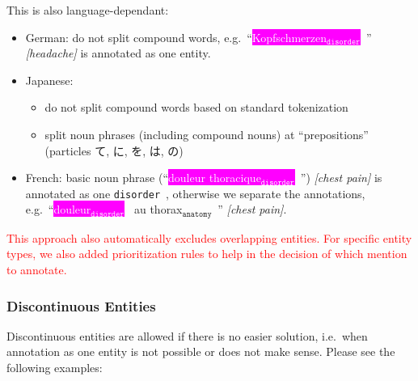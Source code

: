 \documentclass[12pt]{article}
\theoremstyle{definition}
\newcommand{\anatomy}[1]{\colorbox{dollarbill}{#1$_{\texttt{anatomy}}$}\ }
\newcommand{\disorder}[1]{\colorbox{fuchsia}{\textcolor{white}{#1$_{\texttt{disorder}}$}}\ }
\newcommand{\dis}{\texttt{disorder}\ }
\begin{document}
This is also language-dependant:
\begin{itemize}
    \item German: do not split compound words, e.g.~``\disorder{Kopfschmerzen}'' \textit{[headache]} is annotated as one entity.
    \item Japanese: 
    \begin{itemize}
        \item do not split compound words based on standard tokenization
        \item split noun phrases (including compound nouns) at ``prepositions'' (particles て, に, を, は, の)
    \end{itemize}
    
    \item French: basic noun phrase (``\disorder{douleur thoracique}'') \textit{[chest pain]} is annotated as one \dis, otherwise we separate the annotations, e.g.~``\disorder{douleur} au \anatomy{thorax}'' \textit{[chest pain]}.
\end{itemize}
\textcolor{red}{This approach also automatically excludes overlapping entities. For specific entity types, we also added prioritization rules to help in the decision of which mention to annotate.}

\subsubsection*{Discontinuous Entities}

Discontinuous entities are allowed if there is no easier solution, i.e.~when annotation as one entity is not possible or does not make sense. 
Please see the following examples:
\end{document}
